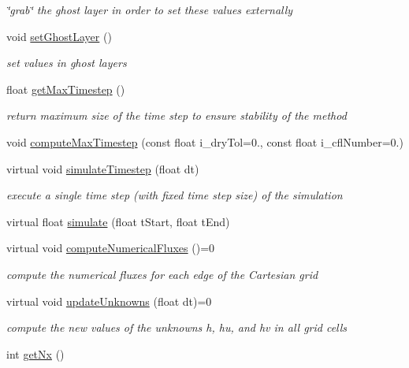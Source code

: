 \begin{DoxyCompactItemize}
\begin{DoxyCompactList}\small\item\em \char`\"{}grab\char`\"{} the ghost layer in order to set these values externally \end{DoxyCompactList}\item 
void \hyperlink{classSWE__Block_afd17334abee3145e27cc3c9b7b935da2}{set\-Ghost\-Layer} ()
\begin{DoxyCompactList}\small\item\em set values in ghost layers \end{DoxyCompactList}\item 
float \hyperlink{classSWE__Block_a74da1eb712e639e47b5b848081b2afad}{get\-Max\-Timestep} ()
\begin{DoxyCompactList}\small\item\em return maximum size of the time step to ensure stability of the method \end{DoxyCompactList}\item 
void \hyperlink{classSWE__Block_acf2ff6617cbc0d3d837f0e618039cfe2}{compute\-Max\-Timestep} (const float i\-\_\-dry\-Tol=0., const float i\-\_\-cfl\-Number=0.)
\item 
virtual void \hyperlink{classSWE__Block_add6908e1ceb261a0a1f3ebc262cc5f11}{simulate\-Timestep} (float dt)
\begin{DoxyCompactList}\small\item\em execute a single time step (with fixed time step size) of the simulation \end{DoxyCompactList}\item 
virtual float \hyperlink{classSWE__Block_a69784e2be2d09035fb2af9d306768f07}{simulate} (float t\-Start, float t\-End)
\item 
virtual void \hyperlink{classSWE__Block_a94dcf2c6ae31731e4586e45628b0c00e}{compute\-Numerical\-Fluxes} ()=0
\begin{DoxyCompactList}\small\item\em compute the numerical fluxes for each edge of the Cartesian grid \end{DoxyCompactList}\item 
virtual void \hyperlink{classSWE__Block_ab2b4b659f23d5d45413dece8d2da3298}{update\-Unknowns} (float dt)=0
\begin{DoxyCompactList}\small\item\em compute the new values of the unknowns h, hu, and hv in all grid cells \end{DoxyCompactList}\item 
\hypertarget{classSWE__Block_aa27028fa4bc13bb2d9251b09e0fdfce6}{int \hyperlink{classSWE__Block_aa27028fa4bc13bb2d9251b09e0fdfce6}{get\-Nx} ()}\label{classSWE__Block_aa27028fa4bc13bb2d9251b09e0fdfce6}


\end{DoxyCompactItemize}
